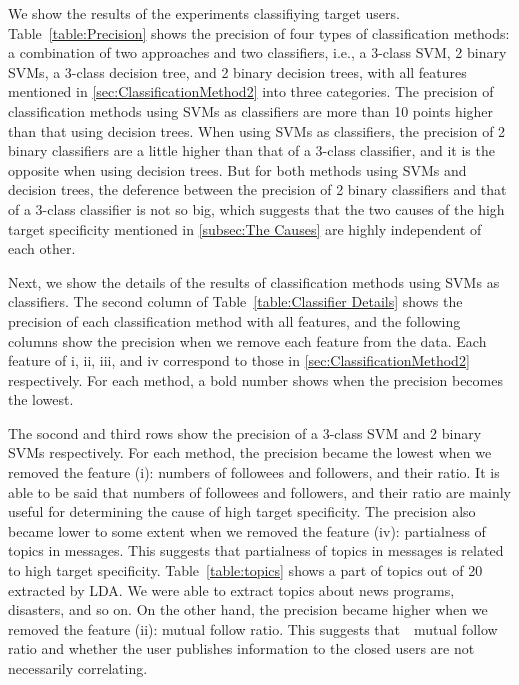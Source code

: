 We show the results of the experiments classifiying target users.
Table~\ref{table:Precision} shows the precision of four types of
classification methods: a combination of two approaches and two
classifiers, i.e., a 3-class SVM, 2 binary SVMs, a 3-class decision
tree, and 2 binary decision trees, with all features mentioned in
\ref{sec:ClassificationMethod2} into three categories.  The precision
of classification methods using SVMs as classifiers are more than 10
points higher than that using decision trees.  When using SVMs as
classifiers, the precision of 2 binary classifiers are a little higher
than that of a 3-class classifier, and it is the opposite when using
decision trees.  But for both methods using SVMs and decision trees, the
deference between the precision of 2 binary classifiers and that of a
3-class classifier is not so big, which suggests that the two causes of
the high target specificity mentioned in \ref{subsec:The Causes} are
highly independent of each other.

Next, we show the details of the results of classification methods using
SVMs as classifiers.  The second column of Table~\ref{table:Classifier
Details} shows the precision of each classification method with all
features, and the following columns show the precision when we remove
each feature from the data.  Each feature of i, ii, iii, and iv
correspond to those in \ref{sec:ClassificationMethod2} respectively.
For each method, a bold number shows when the precision becomes the
lowest.

The socond and third rows show the precision of a 3-class SVM
and 2 binary SVMs respectively.  For each method, the precision became
the lowest when we removed the feature (i): numbers of followees and
followers, and their ratio.  It is able to be said that numbers of
followees and followers, and their ratio are mainly useful for
determining the cause of high target specificity.  The precision also
became lower to some extent when we removed the feature (iv):
partialness of topics in messages.  This suggests that partialness of
topics in messages is related to high target specificity.
Table~\ref{table:topics} shows a part of topics out of 20 extracted by
LDA.  We were able to extract topics about news programs, disasters, and
so on.  On the other hand, the precision became higher when we　removed
the feature (ii): mutual follow ratio.  This suggests that　mutual
follow ratio and whether the user publishes information to the closed
users are not necessarily correlating.

